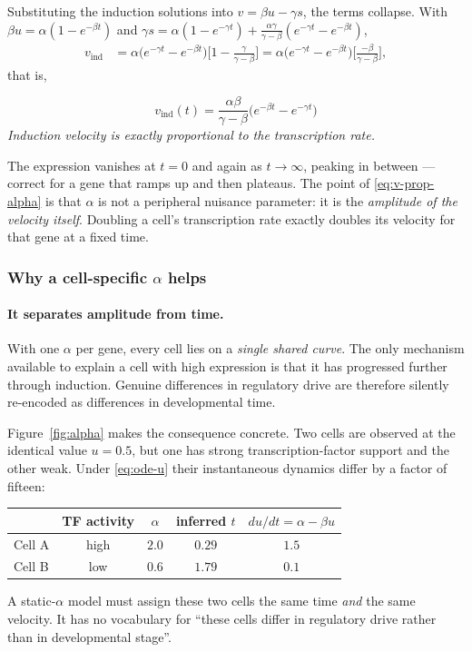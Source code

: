 \documentclass[11pt,a4paper]{article}
\newenvironment{keybox}{\begin{shaded}\noindent}{\end{shaded}}
\newcommand{\uns}{u}
\newcommand{\spl}{s}
\theoremstyle{definition}
\begin{document}
Substituting the induction solutions into $v = \beta \uns - \gamma \spl$, the
terms collapse. With
$\beta \uns = \alpha(1 - e^{-\beta t})$ and
$\gamma \spl = \alpha(1-e^{-\gamma t}) + \frac{\alpha\gamma}{\gamma-\beta}(e^{-\gamma t} - e^{-\beta t})$,
%
\begin{align}
v_{\text{ind}}
&= \alpha\big(e^{-\gamma t} - e^{-\beta t}\big)\Big[1 - \tfrac{\gamma}{\gamma-\beta}\Big]
 = \alpha\big(e^{-\gamma t} - e^{-\beta t}\big)\Big[\tfrac{-\beta}{\gamma-\beta}\Big],
\end{align}
%
that is,
%
\begin{keybox}
\begin{equation}
\boxed{\; v_{\text{ind}}(t) = \frac{\alpha\beta}{\gamma - \beta}
\Big(e^{-\beta t} - e^{-\gamma t}\Big) \;}
\label{eq:v-prop-alpha}
\end{equation}
\emph{Induction velocity is exactly proportional to the transcription rate.}
\end{keybox}
%
The expression vanishes at $t = 0$ and again as $t \to \infty$, peaking in
between --- correct for a gene that ramps up and then plateaus. The point of
\eqref{eq:v-prop-alpha} is that $\alpha$ is not a peripheral nuisance
parameter: it is the \emph{amplitude of the velocity itself}. Doubling a cell's
transcription rate exactly doubles its velocity for that gene at a fixed time.

\subsubsection{Why a cell-specific \texorpdfstring{$\alpha$}{alpha} helps}

\paragraph{It separates amplitude from time.} With one $\alpha$ per gene, every
cell lies on a \emph{single shared curve}. The only mechanism available to
explain a cell with high expression is that it has progressed further through
induction. Genuine differences in regulatory drive are therefore silently
re-encoded as differences in developmental time.

Figure~\ref{fig:alpha} makes the consequence concrete. Two cells are observed
at the identical value $\uns = 0.5$, but one has strong transcription-factor
support and the other weak. Under \eqref{eq:ode-u} their instantaneous
dynamics differ by a factor of fifteen:
%
\begin{center}
\begin{tabular}{@{}lcccc@{}}
\toprule
& TF activity & $\alpha$ & inferred $t$ & $d\uns/dt = \alpha - \beta \uns$ \\
\midrule
Cell A & high & $2.0$ & $0.29$ & $\mathbf{1.5}$ \\
Cell B & low  & $0.6$ & $1.79$ & $\mathbf{0.1}$ \\
\bottomrule
\end{tabular}
\end{center}
%
A static-$\alpha$ model must assign these two cells the same time \emph{and}
the same velocity. It has no vocabulary for ``these cells differ in regulatory
drive rather than in developmental stage''.
\end{document}
